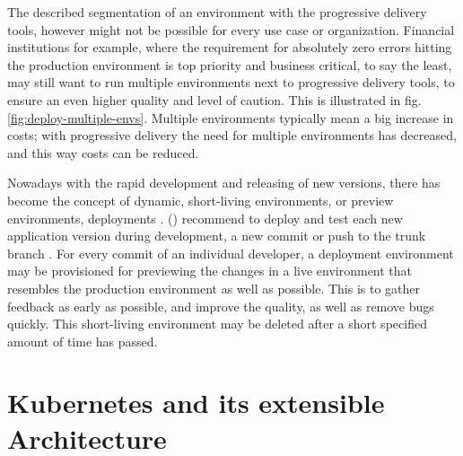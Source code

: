 
The described segmentation of an environment with the progressive delivery
tools, however might not be possible for every use case or organization.
Financial institutions for example, where the requirement for absolutely zero
errors hitting the production environment is top priority and business critical,
to say the least,
may still want to run multiple environments next to progressive delivery tools,
to ensure an even higher quality and level of caution.
This is illustrated in fig. \ref{fig:deploy-multiple-envs}.
Multiple environments typically mean a big increase in costs;
with progressive delivery the need for multiple environments has decreased,
and this way costs can be reduced.



Nowadays with the rapid development and releasing of new versions,
there has become the concept of dynamic, short-living environments,
or preview environments, deployments
\autocite{gitopsCloudnativeCDInnoq}.
\citeauthor{hightower2017kubernetes} (\citeyear{hightower2017kubernetes})
recommend to deploy and test each new application version during development,
a new commit or push to the trunk branch
\autocite{hightower2017kubernetes}.
%
For every commit of an individual developer,
a deployment environment may be provisioned for previewing the changes
in a live environment that resembles the production environment as well as possible.
This is to gather feedback as early as possible,
and improve the quality, as well as remove bugs quickly.
This short-living environment may be deleted after a short specified
amount of time has passed.







\section{Kubernetes and its extensible Architecture}
\label{theoretical-background:kubernetes}

